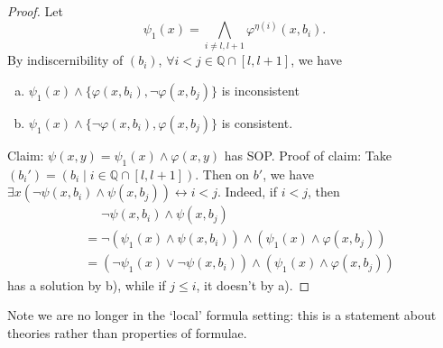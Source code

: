 \documentclass{article}
\begin{document}
\begin{proof}
  Let
  \begin{equation*}
  \psi_1(x) = \bigwedge_{i\neq l,l+1} \varphi^{\eta(i)} (x,b_i).
  \end{equation*}
  By indiscernibility of $(b_i)$, $\forall i < j \in \mathbb{Q} \cap [l,l+1]$, we have
  \begin{enumerate}[(a)]
    \item $\psi_1(x) \land \{\varphi(x,b_i), \neg \varphi(x,b_j)\}$ is inconsistent
    \item $\psi_1(x) \land \{\neg\varphi(x,b_i), \varphi(x,b_j)\}$ is consistent.
  \end{enumerate}
  Claim: $\psi(x,y) = \psi_1(x) \land \varphi(x,y)$ has SOP.
  Proof of claim: Take $(b_i') = (b_i \mid i \in \mathbb{Q} \cap [l,l+1])$.
  Then on $b'$, we have $\exists x (\neg \psi(x,b_i) \land \psi(x,b_j)) \leftrightarrow i < j$.
  Indeed, if $i < j$, then
  \begin{align*}
    &\phantom{=}\neg\psi(x,b_i) \land \psi(x,b_j) \\
    &= \neg(\psi_1(x) \land \psi(x,b_i)) \land (\psi_1(x) \land \varphi(x,b_j)) \\
    &= (\neg \psi_1(x) \lor \neg \psi(x,b_i)) \land (\psi_1(x) \land \varphi(x,b_j))
  \end{align*}
  has a solution by b), while if $j \leq i$, it doesn't by a).
\end{proof}

Note we are no longer in the `local' formula setting: this is a statement about theories rather than properties of formulae.
\end{document}
